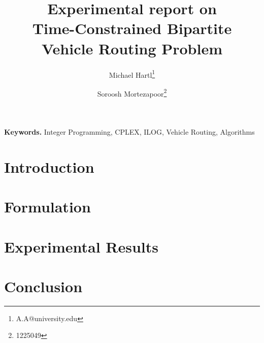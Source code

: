 \documentclass[fancy]{article}
\title{\vspace{-15mm}Experimental report on \vspace{5mm} \\
\fontsize{24pt}{10pt}\selectfont\textbf{Time-Constrained Bipartite Vehicle Routing Problem}}
\author[1]{Michael Hartl\thanks{A.A@university.edu}}
\author[1]{Soroosh Mortezapoor\thanks{1225049}}
\affil[1]{Vienna University of Technology}
\date{}
\begin{document}
\maketitle %
\begin{abstract}

\end{abstract}


\thispagestyle{fancy} %








\smallskip
\noindent \textbf{Keywords.} Integer Programming, CPLEX, ILOG, Vehicle Routing,
Algorithms




\section{Introduction}


\section{Formulation}


\section{Experimental Results}


\section{Conclusion}




 

\end{document}
